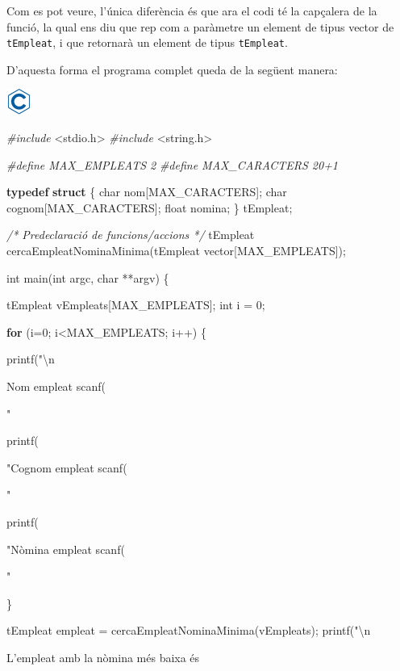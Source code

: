 \documentclass[]{book}
\newenvironment{Shaded}{\begin{snugshade}}{\end{snugshade}}
\newcommand{\KeywordTok}[1]{\textcolor[rgb]{0.13,0.29,0.53}{\textbf{#1}}}
\newcommand{\DataTypeTok}[1]{\textcolor[rgb]{0.13,0.29,0.53}{#1}}
\newcommand{\DecValTok}[1]{\textcolor[rgb]{0.00,0.00,0.81}{#1}}
\newcommand{\SpecialCharTok}[1]{\textcolor[rgb]{0.00,0.00,0.00}{#1}}
\newcommand{\StringTok}[1]{\textcolor[rgb]{0.31,0.60,0.02}{#1}}
\newcommand{\ImportTok}[1]{#1}
\newcommand{\CommentTok}[1]{\textcolor[rgb]{0.56,0.35,0.01}{\textit{#1}}}
\newcommand{\ControlFlowTok}[1]{\textcolor[rgb]{0.13,0.29,0.53}{\textbf{#1}}}
\newcommand{\PreprocessorTok}[1]{\textcolor[rgb]{0.56,0.35,0.01}{\textit{#1}}}
\newcommand{\NormalTok}[1]{#1}
\begin{document}
Com es pot veure, l'única diferència és que ara el codi té la capçalera
de la funció, la qual ens diu que rep com a paràmetre un element de
tipus vector de \texttt{tEmpleat}, i que retornarà un element de tipus
\texttt{tEmpleat}.

D'aquesta forma el programa complet queda de la següent manera:

\includegraphics{./img/c.png}

\begin{Shaded}
\begin{Highlighting}[]
\PreprocessorTok{#include }\ImportTok{<stdio.h>}
\PreprocessorTok{#include }\ImportTok{<string.h>}

\PreprocessorTok{#define MAX_EMPLEATS 2}
\PreprocessorTok{#define MAX_CARACTERS 20+1}

\KeywordTok{typedef} \KeywordTok{struct}\NormalTok{ \{}
    \DataTypeTok{char}\NormalTok{ nom[MAX_CARACTERS];}
    \DataTypeTok{char}\NormalTok{ cognom[MAX_CARACTERS];}
    \DataTypeTok{float}\NormalTok{ nomina;}
\NormalTok{\} tEmpleat;}

\CommentTok{/* Predeclaració de funcions/accions */}
\NormalTok{tEmpleat cercaEmpleatNominaMinima(tEmpleat vector[MAX_EMPLEATS]);}

\DataTypeTok{int}\NormalTok{ main(}\DataTypeTok{int}\NormalTok{ argc, }\DataTypeTok{char}\NormalTok{ **argv) \{}

\NormalTok{    tEmpleat vEmpleats[MAX_EMPLEATS];}
    \DataTypeTok{int}\NormalTok{ i = }\DecValTok{0}\NormalTok{;}

    \ControlFlowTok{for}\NormalTok{ (i=}\DecValTok{0}\NormalTok{; i<MAX_EMPLEATS; i++) \{}

\NormalTok{        printf(}\StringTok{"}\SpecialCharTok{\textbackslash{}n}\StringTok{Nom empleat %
\NormalTok{        scanf(}\StringTok{"%

\NormalTok{        printf(}\StringTok{"Cognom empleat %
\NormalTok{        scanf(}\StringTok{"%

\NormalTok{        printf(}\StringTok{"Nòmina empleat %
\NormalTok{        scanf(}\StringTok{"%

\NormalTok{    \}}

\NormalTok{    tEmpleat empleat = cercaEmpleatNominaMinima(vEmpleats);}
\NormalTok{    printf(}\StringTok{"}\SpecialCharTok{\textbackslash{}n}\StringTok{L'empleat amb la nòmina més baixa és %

}}}}}}}
\end{Highlighting}
\end{Shaded}
\end{document}
